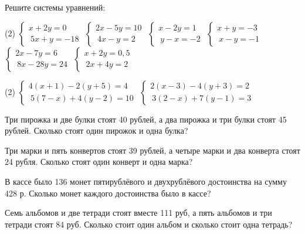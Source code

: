 \begin{class}[number=6]
	\begin{listofex}
		\item Решите системы уравнений:
		\begin{tasks}(2)
			\task \( \begin{cases}
				x+2y=0\\\
				5x+y=-18
			\end{cases} \)
			\task \( \begin{cases}
				2x-5y=10\\\
				4x-y=2
			\end{cases} \)
			\task \( \begin{cases}
				x-2y=1\\\
				y-x=-2
			\end{cases} \)
			\task \( \begin{cases}
				x+y=-3\\\
				x-y=-1
			\end{cases} \)
			\task \( \begin{cases}
				2x-7y=6\\\
				8x-28y=24
			\end{cases} \)
			\task \( \begin{cases}
				x+2y=0,5\\\
				2x+4y=2
			\end{cases} \)
		\end{tasks}
		\item 
		\begin{tasks}(2)
			\task \( \begin{cases}
				4(x+1)-2(y+5)=4\\\ 5(7-x)+4(y-2)=10
			\end{cases} \)
			\task \( \begin{cases}
				2(x-3)-4(y+3)=2\\\ 3(2-x)+7(y-1)=3
			\end{cases} \)
		\end{tasks}
		\item Три пирожка и две булки стоят 40 рублей, а два пирожка и три булки стоят 45 рублей. Сколько стоят один пирожок и одна булка?
		\item Три марки и пять конвертов стоят 39 рублей, а четыре марки и два конверта стоят 24 рубля. Сколько стоят один конверт и одна марка?
		\item  В кассе было 136 монет пятирублёвого и  двухрублёвого достоинства на сумму 428 р. Сколько монет каждого достоинства было в кассе?
		\item Семь альбомов и две тетради стоят вместе 111 руб, а пять альбомов и три тетради стоят 84 руб. Сколько стоит один альбом и сколько стоит одна тетрадь?
		
		
	\end{listofex}
\end{class}

